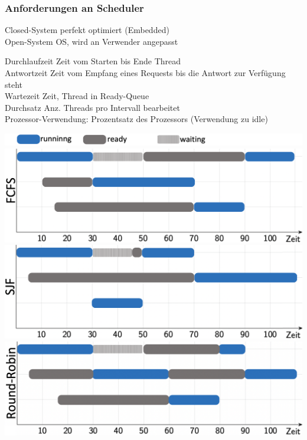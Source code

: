 \begin{multicols*}{5}
	\vspace{-4pt}
	\subsubsection{Anforderungen an Scheduler}
	\textcolor{h}{Closed-System} perfekt optimiert (Embedded)\\
	\textcolor{h}{Open-System} OS, wird an Verwender angepasst

	\vspace{-2pt}
	\drule{\linewidth}{1pt}
	\textcolor{h}{Durchlaufzeit} Zeit vom Starten bis Ende Thread\\
	\textcolor{h}{Antwortzeit} Zeit vom Empfang eines Requests bis die Antwort zur Verfügung steht\\
	\textcolor{h}{Wartezeit} Zeit, Thread in Ready-Queue\\
	\textcolor{h}{Durchsatz} Anz. Threads pro Intervall bearbeitet\\
	\textcolor{h}{Prozessor-Verwendung:} Prozentsatz des Prozessors (Verwendung zu idle)\\

	\vspace{-23pt}
	\begin{center}
		\includegraphics[scale =.155]{./Graphic/Infobar.png}
		\includegraphics[scale =.155]{./Graphic/FCFS.png}
		\includegraphics[scale =.155]{./Graphic/SJF.png}
		\includegraphics[scale =.155]{./Graphic/RoundRobin.png}
	\end{center}


\end{multicols*}
